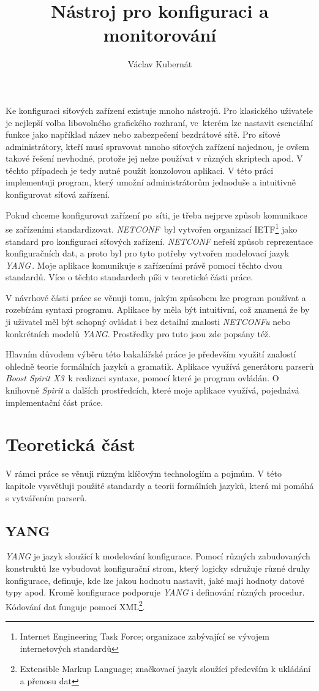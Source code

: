 \documentclass[thesis=B,czech,hidelinks]{FITthesis}[2019/03/06]
\title{Nástroj pro konfiguraci a monitorování}
\author{Václav Kubernát}
\begin{document}
\begin{introduction}
Ke konfiguraci síťových zařízení existuje mnoho nástrojů. Pro klasického uživatele je nejlepší volba libovolného grafického rozhraní, ve~kterém lze nastavit esenciální funkce jako například název nebo zabezpečení bezdrátové sítě. Pro síťové administrátory, kteří musí spravovat mnoho síťových zařízení najednou, je ovšem takové řešení nevhodné, protože jej nelze používat v různých skriptech apod. V těchto případech je tedy nutné použít konzolovou aplikaci. V této práci implementuji program, který umožní administrátorům jednoduše a intuitivně konfigurovat síťová zařízení.

Pokud chceme konfigurovat zařízení po~síti, je třeba nejprve způsob komunikace se zařízeními standardizovat. \textit{NETCONF}\,\cite{rfcNetconf} byl vytvořen organizací IETF\footnote{Internet Engineering Task Force; organizace zabývající se vývojem internetových standardů} jako standard pro konfiguraci síťových zařízení. \textit{NETCONF} neřeší způsob reprezentace konfiguračních dat, a proto byl pro tyto potřeby vytvořen modelovací jazyk \textit{YANG}\,\cite{rfcYang}. Moje aplikace komunikuje s zařízeními právě pomocí těchto dvou standardů. Více o těchto standardech píši v teoretické části práce.

V návrhové části práce se věnuji tomu, jakým způsobem lze program používat a rozebírám syntaxi programu. Aplikace by měla být intuitivní, což znamená že by ji uživatel měl být schopný ovládat i bez detailní znalosti \textit{NETCONFu} nebo konkrétních modelů \textit{YANG}. Prostředky pro tuto  jsou zde popsány též.

Hlavním důvodem výběru této bakalářské práce je především využití znalostí ohledně teorie formálních jazyků a gramatik. Aplikace využívá generátoru parserů \textit{Boost Spirit X3}\,\cite{boost:spirit} k realizaci syntaxe, pomocí které je program ovládán. O knihovně \textit{Spirit} a dalších prostředcích, které moje aplikace využívá, pojednává implementační část práce.
\end{introduction}

\chapter{Teoretická část}
V rámci práce se věnuji různým klíčovým technologiím a pojmům. V této kapitole vysvětluji použité standardy a teorii formálních jazyků, která mi pomáhá s vytvářením parserů.


\section{YANG}
\textit{YANG} je jazyk sloužící k modelování konfigurace. Pomocí různých zabudovaných konstruktů lze vybudovat konfigurační strom, který logicky sdružuje různé druhy konfigurace, definuje, kde lze jakou hodnotu nastavit, jaké mají hodnoty datové typy apod. Kromě konfigurace podporuje \textit{YANG} i definování různých procedur. Kódování dat funguje pomocí XML\footnote{Extensible Markup Language; značkovací jazyk sloužící především k ukládání a přenosu dat}\@.
\end{document}
